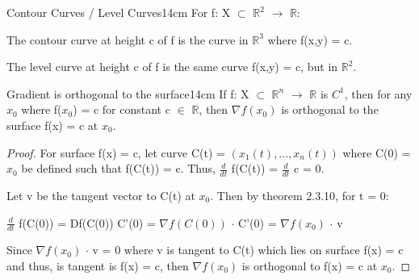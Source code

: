     \vspace{0.5cm}



    \begin{definition}{Contour Curves / Level Curves}{14cm}
        For f: X $\subset$ $\mathbb{R}^2$ $\rightarrow$ $\mathbb{R}$:

        \hspace{0.5cm}
        The {\color{lblue} contour curve} at height c of f
        is the curve in $\mathbb{R}^3$ where f(x,y) = c.

        \hspace{0.5cm}
        The {\color{lblue} level curve} at height c of f
        is the same curve f(x,y) = c, but in $\mathbb{R}^2$.
    \end{definition}

    \newpage



    \begin{wtheorem}{Gradient is orthogonal to the surface}{14cm}
        If f: X $\subset$ $\mathbb{R}^n$ $\rightarrow$ $\mathbb{R}$
        is $C^1$, then for any $x_0$ where f($x_0$) = c for constant
        c $\in$ $\mathbb{R}$, then $\nabla f(x_0)$ is orthogonal
        to the surface f(x) = c at $x_0$.
    \end{wtheorem}

    \begin{proof}
        For surface f(x) = c, let curve C(t) = $(x_1(t),...,x_n(t))$
        where C(0) = $x_0$ be defined such that f(C(t)) = c.
        Thus,
        $\frac{d}{dt}$ f(C(t))
        = $\frac{d}{dt}$ c = 0.

        Let v be the tangent vector to C(t) at $x_0$.
        Then by {\color{red} theorem 2.3.10}, for t = 0:

        \hspace{0.5cm}
        $\frac{d}{dt}$ f(C(0))
        = Df(C(0)) C'(0)
        = $\nabla f(C(0))$ $\cdot$ C'(0)
        = $\nabla f(x_0)$ $\cdot$ v

        Since $\nabla f(x_0)$ $\cdot$ v = 0
        where v is tangent to C(t) which lies on surface f(x) = c and thus,
        is tangent is f(x) = c, then $\nabla f(x_0)$ is orthogonal to f(x) = c
        at $x_0$.
    \end{proof}




    